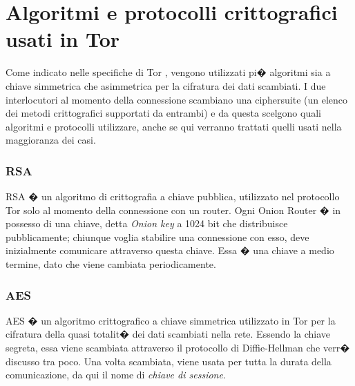 \section{Algoritmi e protocolli crittografici usati in Tor}
Come indicato nelle specifiche di Tor \cite{torspec}, vengono utilizzati pi� algoritmi sia a chiave simmetrica che asimmetrica per la cifratura dei dati scambiati. I due interlocutori al momento della connessione scambiano una ciphersuite (un elenco dei metodi crittografici supportati da entrambi) e da questa scelgono quali algoritmi e protocolli utilizzare, anche se qui verranno trattati quelli usati nella maggioranza dei casi.

\subsubsection{RSA}
RSA � un algoritmo di crittografia a chiave pubblica, utilizzato nel protocollo Tor solo al momento della connessione con un router. Ogni Onion Router � in possesso di una chiave, detta \emph{Onion key} a 1024 bit che distribuisce pubblicamente; chiunque voglia stabilire una connessione con esso, deve inizialmente comunicare attraverso questa chiave. Essa � una chiave a medio termine, dato che viene cambiata periodicamente.

\subsubsection{AES}
AES � un algoritmo crittografico a chiave simmetrica utilizzato in Tor per la cifratura della quasi totalit� dei dati scambiati nella rete. Essendo la chiave segreta, essa viene scambiata attraverso il protocollo di Diffie-Hellman che verr� discusso tra poco. Una volta scambiata, viene usata per tutta la durata della comunicazione, da qui il nome di \emph{chiave di sessione}.

